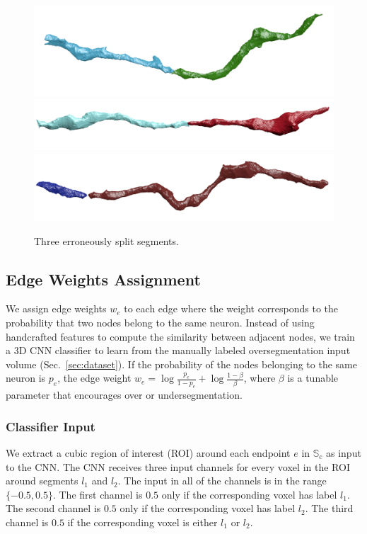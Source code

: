 \begin{figure}[t]
	\centering
	\includegraphics[width=0.92\linewidth]{./figures/split_error1.png}
	\includegraphics[width=0.92\linewidth]{./figures/split_error2.png}		\includegraphics[width=0.85\linewidth]{./figures/merge_candidate2.png}
	\caption{Three erroneously split segments.}
	\label{fig:merge_candidates}
\end{figure}

\subsection{Edge Weights Assignment}
We assign edge weights $w_e$ to each edge where the weight corresponds to the probability that two nodes belong to the same neuron.
Instead of using handcrafted features to compute the similarity between adjacent nodes, we train a 3D CNN classifier to learn from the manually labeled oversegmentation input volume (Sec.~\ref{sec:dataset}).
If the probability of the nodes belonging to the same neuron is $p_e$, the edge weight $w_e = \log{\frac{p_e}{1 - p_e}} + \log{\frac{1 - \beta}{\beta}}$, where $\beta$ is a tunable parameter that encourages over or undersegmentation.

\subsubsection{Classifier Input}

We extract a cubic region of interest (ROI) around each endpoint $e$ in $\mathbb{S}_c$ as input to the CNN. The CNN receives three input channels for every voxel in the ROI around segments $l_1$ and $l_2$. The input in all of the channels is in the range $\{-0.5, 0.5\}$. The first channel is $0.5$ only if the corresponding voxel has label $l_1$. The second channel is $0.5$ only if the corresponding voxel has label $l_2$. The third channel is $0.5$ if the corresponding voxel is either $l_1$ or $l_2$.

